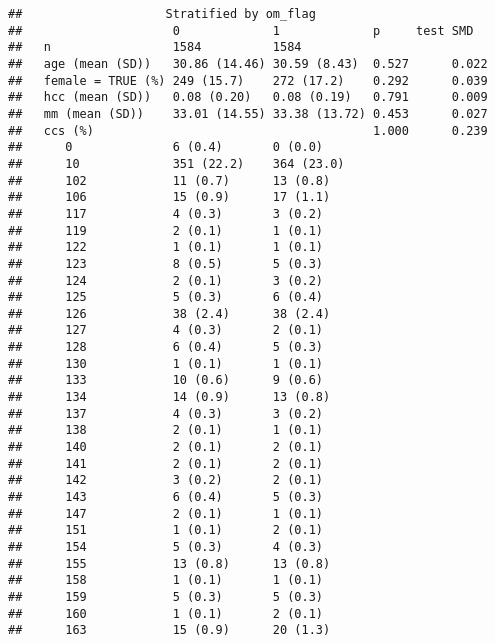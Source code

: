 \documentclass[]{article}
\begin{document}
\begin{verbatim}
##                    Stratified by om_flag
##                     0             1             p     test SMD  
##   n                 1584          1584                          
##   age (mean (SD))   30.86 (14.46) 30.59 (8.43)  0.527      0.022
##   female = TRUE (%) 249 (15.7)    272 (17.2)    0.292      0.039
##   hcc (mean (SD))   0.08 (0.20)   0.08 (0.19)   0.791      0.009
##   mm (mean (SD))    33.01 (14.55) 33.38 (13.72) 0.453      0.027
##   ccs (%)                                       1.000      0.239
##      0              6 (0.4)       0 (0.0)                       
##      10             351 (22.2)    364 (23.0)                    
##      102            11 (0.7)      13 (0.8)                      
##      106            15 (0.9)      17 (1.1)                      
##      117            4 (0.3)       3 (0.2)                       
##      119            2 (0.1)       1 (0.1)                       
##      122            1 (0.1)       1 (0.1)                       
##      123            8 (0.5)       5 (0.3)                       
##      124            2 (0.1)       3 (0.2)                       
##      125            5 (0.3)       6 (0.4)                       
##      126            38 (2.4)      38 (2.4)                      
##      127            4 (0.3)       2 (0.1)                       
##      128            6 (0.4)       5 (0.3)                       
##      130            1 (0.1)       1 (0.1)                       
##      133            10 (0.6)      9 (0.6)                       
##      134            14 (0.9)      13 (0.8)                      
##      137            4 (0.3)       3 (0.2)                       
##      138            2 (0.1)       1 (0.1)                       
##      140            2 (0.1)       2 (0.1)                       
##      141            2 (0.1)       2 (0.1)                       
##      142            3 (0.2)       2 (0.1)                       
##      143            6 (0.4)       5 (0.3)                       
##      147            2 (0.1)       1 (0.1)                       
##      151            1 (0.1)       2 (0.1)                       
##      154            5 (0.3)       4 (0.3)                       
##      155            13 (0.8)      13 (0.8)                      
##      158            1 (0.1)       1 (0.1)                       
##      159            5 (0.3)       5 (0.3)                       
##      160            1 (0.1)       2 (0.1)                       
##      163            15 (0.9)      20 (1.3)                      

\end{verbatim}
\end{document}
